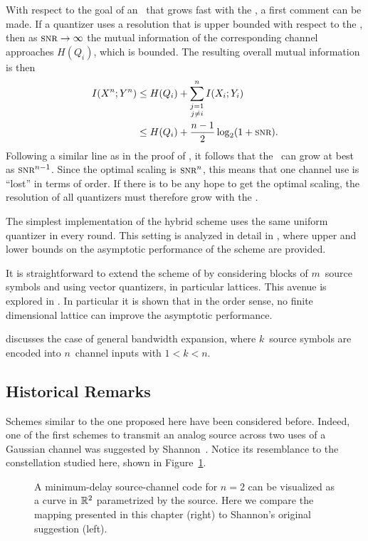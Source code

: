 With respect to the goal of an \sdr\ that grows fast with the \snr, a first
comment can be made. If a quantizer uses a resolution that is upper
bounded with respect to the \snr, then as $\snr \goesto \infty$ the mutual
information of the corresponding channel approaches $H(Q_i)$, which is bounded.
The resulting overall mutual information is then
\begin{align*}
  I(X^n; Y^n) &\le H(Q_i) + \sum_{\substack{j = 1 \\ j \ne i}}^n I(X_i; Y_i) \\
  &\le H(Q_i) + \frac{n-1}{2} \log_2(1 + \snr).
\end{align*}
Following a similar line as in the proof of , it follows that the
\sdr\ can grow at best as $\snr^{n-1}$. Since the optimal scaling is $\snr^n$,
this means that one channel use is ``lost'' in terms of order.  If there is to
be any hope to get the optimal scaling, the resolution of all quantizers must
therefore grow with the \snr.

The simplest implementation of the hybrid scheme uses the same uniform quantizer
in every round. This setting is analyzed in detail in ,
where upper and lower bounds on the asymptotic performance of the scheme are
provided. 

It is straightforward to extend the scheme of  by
considering blocks of $m$~source symbols and using vector quantizers, in
particular lattices. This avenue is explored in . In
particular it is shown that in the order sense, no finite dimensional lattice
can improve the asymptotic performance. 

 discusses the case of general bandwidth expansion, where
$k$~source symbols are encoded into $n$~channel inputs with $1 < k < n$. 

\subsection{Historical Remarks}

Schemes similar to the one proposed here have been considered before. Indeed,
one of the first schemes to transmit an analog source across two uses of a
Gaussian channel was suggested by Shannon~\cite{Shannon1949}. Notice its
resemblance to the constellation studied here, shown in
Figure~\ref{fig:shannoncomparison}.
\begin{figure}
  \centerline{
  \hfil
  \subfloat[Mapping proposed in this paper
  (for~$n=2$).]{} }%
  \caption{A minimum-delay source-channel code for $n=2$ can be visualized as a
  curve in $\mathbb{R}^2$ parametrized by the source. Here we compare the mapping
  presented in this chapter (right) to Shannon's original suggestion (left).}
  \label{fig:shannoncomparison}
\end{figure}

